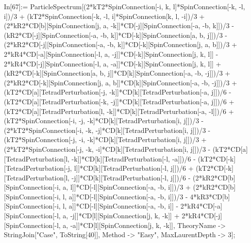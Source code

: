 In[67]:= ParticleSpectrum[(2*kT2*SpinConnection[-i, k, l]*SpinConnection[-k, -l, i])/3 + (kT2*SpinConnection[-k, -l, i]*SpinConnection[k, l, -i])/3 + (2*kR2*CD[b][SpinConnection[j, a, -k]]*CD[-j][SpinConnection[-a, -b, k]])/3 - (kR2*CD[-j][SpinConnection[-a, -b, k]]*CD[-k][SpinConnection[a, b, j]])/3 - (2*kR2*CD[-j][SpinConnection[-a, -b, k]]*CD[-k][SpinConnection[j, a, b]])/3 + 2*kR4*CD[-a][SpinConnection[-l, a, -j]]*CD[-k][SpinConnection[j, k, l]] - 2*kR4*CD[-j][SpinConnection[-l, a, -a]]*CD[-k][SpinConnection[j, k, l]] + (kR2*CD[-k][SpinConnection[a, b, j]]*CD[k][SpinConnection[-a, -b, -j]])/3 + (2*kR2*CD[-k][SpinConnection[j, a, b]]*CD[k][SpinConnection[-a, -b, -j]])/3 + (kT2*CD[a][TetradPerturbation[-j, -k]]*CD[k][TetradPerturbation[-a, j]])/6 - (kT2*CD[a][TetradPerturbation[-k, -j]]*CD[k][TetradPerturbation[-a, j]])/6 + (kT2*CD[a][TetradPerturbation[l, -k]]*CD[k][TetradPerturbation[-a, -l]])/6 + (kT2*SpinConnection[-i, -j, -k]*CD[k][TetradPerturbation[i, j]])/3 - (2*kT2*SpinConnection[-i, -k, -j]*CD[k][TetradPerturbation[i, j]])/3 - (kT2*SpinConnection[-j, -i, -k]*CD[k][TetradPerturbation[i, j]])/3 + (2*kT2*SpinConnection[-j, -k, -i]*CD[k][TetradPerturbation[i, j]])/3 - (kT2*CD[a][TetradPerturbation[l, -k]]*CD[k][TetradPerturbation[-l, -a]])/6 - (kT2*CD[-k][TetradPerturbation[-j, l]]*CD[k][TetradPerturbation[-l, j]])/6 + (kT2*CD[-k][TetradPerturbation[l, -j]]*CD[k][TetradPerturbation[-l, j]])/6 - (2*kR2*CD[b][SpinConnection[-i, a, l]]*CD[-l][SpinConnection[-a, -b, i]])/3 + (2*kR2*CD[b][SpinConnection[-i, l, a]]*CD[-l][SpinConnection[-a, -b, i]])/3 - 4*kR3*CD[b][SpinConnection[-i, l, a]]*CD[-l][SpinConnection[-a, -b, i]] - 2*kR4*CD[-a][SpinConnection[-l, a, -j]]*CD[l][SpinConnection[j, k, -k]] + 2*kR4*CD[-j][SpinConnection[-l, a, -a]]*CD[l][SpinConnection[j, k, -k]], TheoryName -> StringJoin["Case", ToString[40]], Method -> "Easy", MaxLaurentDepth -> 3]; 